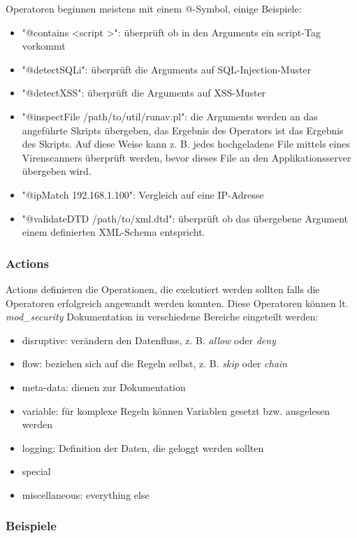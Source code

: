 Operatoren beginnen meistens mit einem @-Symbol, einige Beispiele:

\begin{itemize}
	\item "@contains <script >": überprüft ob in den Arguments ein script-Tag vorkommt
	\item "@detectSQLi": überprüft die Arguments auf SQL-Injection-Muster
	\item "@detectXSS": überprüft die Arguments auf XSS-Muster
	\item "@inspectFile /path/to/util/runav.pl": die Arguments werden an das angeführte Skripts übergeben, das Ergebnis des Operators ist das Ergebnis des Skripts. Auf diese Weise kann z. B. jedes hochgeladene File mittels eines Virenscanners überprüft werden, bevor dieses File an den Applikationsserver übergeben wird.
	\item "@ipMatch 192.168.1.100": Vergleich auf eine IP-Adresse
	\item "@validateDTD /path/to/xml.dtd": überprüft ob das übergebene Argument einem definierten XML-Schema entspricht.
\end{itemize}

\subsubsection{Actions}

Actions definieren die Operationen, die exekutiert werden sollten falls die Operatoren erfolgreich angewandt werden konnten. Diese Operatoren können lt. \textit{mod\_security} Dokumentation in verschiedene Bereiche eingeteilt werden:

\begin{itemize}
	\item disruptive: verändern den Datenfluss, z. B. \textit{allow} oder \textit{deny}
	\item flow: beziehen sich auf die Regeln selbst, z. B. \textit{skip} oder \textit{chain}
	\item meta-data: dienen zur Dokumentation
	\item variable: für komplexe Regeln können Variablen gesetzt bzw. ausgelesen werden
	\item logging: Definition der Daten, die geloggt werden sollten
	\item special
	\item miscellaneous: everything else
\end{itemize}

\subsubsection{Beispiele}

